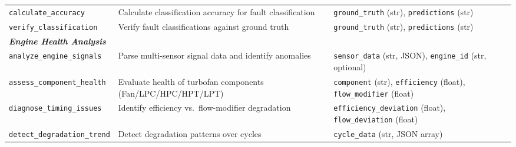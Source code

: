 \documentclass[sigconf, screen, nonacm]{acmart}
\begin{document}
\begin{table}[t]
{\begin{tabular}{@{}llp{6.5cm}@{}}
\texttt{calculate\_accuracy} & Calculate classification accuracy for fault classification & \texttt{ground\_truth} (str), \texttt{predictions} (str) \\
\texttt{verify\_classification} & Verify fault classifications against ground truth & \texttt{ground\_truth} (str), \texttt{predictions} (str) \\
\midrule
\multicolumn{3}{l}{\textbf{\textit{Engine Health Analysis}}} \\
\texttt{analyze\_engine\_signals} & Parse multi-sensor signal data and identify anomalies & \texttt{sensor\_data} (str, JSON), \texttt{engine\_id} (str, optional) \\
\texttt{assess\_component\_health} & Evaluate health of turbofan components (Fan/LPC/HPC/HPT/LPT) & \texttt{component} (str), \texttt{efficiency} (float), \texttt{flow\_modifier} (float) \\
\texttt{diagnose\_timing\_issues} & Identify efficiency vs.\ flow-modifier degradation & \texttt{efficiency\_deviation} (float), \texttt{flow\_deviation} (float) \\
\texttt{detect\_degradation\_trend} & Detect degradation patterns over cycles & \texttt{cycle\_data} (str, JSON array) \\
\bottomrule
\end{tabular}%
}
\end{table}
\end{document}
